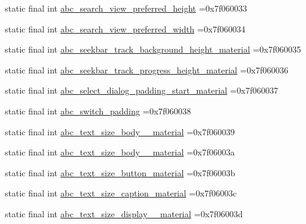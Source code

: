 \begin{DoxyCompactItemize}
\item 
static final int \mbox{\hyperlink{classcom_1_1example_1_1trainawearapplication_1_1_r_1_1dimen_aadc83413bbd5885f4c7da512b43bbf5a}{abc\+\_\+search\+\_\+view\+\_\+preferred\+\_\+height}} =0x7f060033
\item 
static final int \mbox{\hyperlink{classcom_1_1example_1_1trainawearapplication_1_1_r_1_1dimen_a7ceee753822359b649df771bda00ea0d}{abc\+\_\+search\+\_\+view\+\_\+preferred\+\_\+width}} =0x7f060034
\item 
static final int \mbox{\hyperlink{classcom_1_1example_1_1trainawearapplication_1_1_r_1_1dimen_a023a3296fadc5db4135fb2d6f6297923}{abc\+\_\+seekbar\+\_\+track\+\_\+background\+\_\+height\+\_\+material}} =0x7f060035
\item 
static final int \mbox{\hyperlink{classcom_1_1example_1_1trainawearapplication_1_1_r_1_1dimen_aacf010767b017a97a9c5299a1040a4f1}{abc\+\_\+seekbar\+\_\+track\+\_\+progress\+\_\+height\+\_\+material}} =0x7f060036
\item 
static final int \mbox{\hyperlink{classcom_1_1example_1_1trainawearapplication_1_1_r_1_1dimen_a47004ff97073e2633600c01176b1e11b}{abc\+\_\+select\+\_\+dialog\+\_\+padding\+\_\+start\+\_\+material}} =0x7f060037
\item 
static final int \mbox{\hyperlink{classcom_1_1example_1_1trainawearapplication_1_1_r_1_1dimen_ae1ef909588b1e0e97b97ba9c22b9ef2e}{abc\+\_\+switch\+\_\+padding}} =0x7f060038
\item 
static final int \mbox{\hyperlink{classcom_1_1example_1_1trainawearapplication_1_1_r_1_1dimen_ad949a8d9d8890df4f891a00e494edeae}{abc\+\_\+text\+\_\+size\+\_\+body\+\_\+\_\+material}} =0x7f060039
\item 
static final int \mbox{\hyperlink{classcom_1_1example_1_1trainawearapplication_1_1_r_1_1dimen_a4e3db6c0204c96e2af41d63baa843866}{abc\+\_\+text\+\_\+size\+\_\+body\+\_\+\_\+material}} =0x7f06003a
\item 
static final int \mbox{\hyperlink{classcom_1_1example_1_1trainawearapplication_1_1_r_1_1dimen_a1a59329ffaf3e0b41a13404c6b6a55fe}{abc\+\_\+text\+\_\+size\+\_\+button\+\_\+material}} =0x7f06003b
\item 
static final int \mbox{\hyperlink{classcom_1_1example_1_1trainawearapplication_1_1_r_1_1dimen_ab72782d616c0cff05b67a50fea385279}{abc\+\_\+text\+\_\+size\+\_\+caption\+\_\+material}} =0x7f06003c
\item 
static final int \mbox{\hyperlink{classcom_1_1example_1_1trainawearapplication_1_1_r_1_1dimen_a46c45fc1ffde4171ece5e8ea8280261c}{abc\+\_\+text\+\_\+size\+\_\+display\+\_\+\_\+material}} =0x7f06003d

\end{DoxyCompactItemize}
